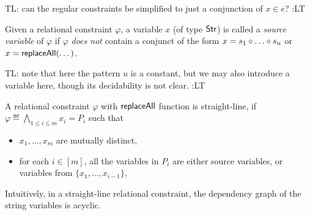 \documentclass{llncs}
\newcommand{\tl}[1]{\color{blue} {TL: #1 :LT} \color{black}}
\begin{document}
\tl{can the regular constraints be simplified to just a conjunction of $x\in e$?}

Given a relational constraint $\varphi$, a variable $x$ (of type ${\sf Str}$) is called a \emph{source variable} of $\varphi$ if $\varphi$ \emph{does not} contain a conjunct of the form $x = s_1 \concat \dots \concat s_n$ or $x = \mathsf{replaceAll}(\dots)$.

\tl{note that here the pattern $u$ is a constant, but we may also introduce a variable here, though its decidability is not clear.} 


\begin{definition}
A relational constraint $ \varphi$ with $\mathsf{replaceAll}$ function is straight-line, if $\varphi \eqdef \bigwedge \limits_{1 \le i \le m} x_i = P_i$ such that
\begin{itemize}
\item $x_1,\dots, x_m$ are mutually distinct,
\item for each $i \in [m]$, all the variables in $P_i$ are either source variables, or variables from $\{x_1,\dots, x_{i-1}\}$,
\end{itemize}
\end{definition}
Intuitively, in a straight-line relational constraint, the dependency graph of the string variables is acyclic.
\end{document}

